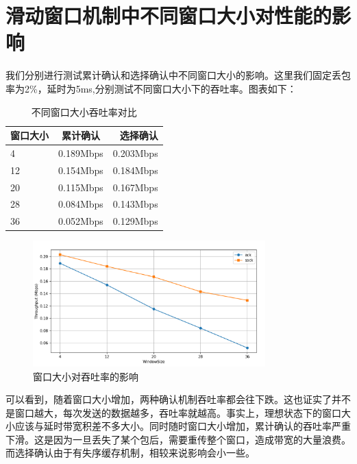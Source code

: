 \documentclass[UTF8,a4paper,10pt]{ctexart}
\begin{document}
\section{滑动窗口机制中不同窗口大小对性能的影响}
我们分别进行测试累计确认和选择确认中不同窗口大小的影响。这里我们固定丢包率为2\%，延时为5ms,分别测试不同窗口大小下的吞吐率。图表如下：
\begin{table}[h!]
  \centering
  \begin{tabular}{|l|c|r|} %
    \hline
     窗口大小   & 累计确认    & 选择确认 \\ \hline
    4  & 0.189Mbps&  0.203Mbps \\ \hline
    12 & 0.154Mbps & 0.184Mbps \\ \hline
    20 & 0.115Mbps & 0.167Mbps \\ \hline
    28 & 0.084Mbps & 0.143Mbps \\ \hline
    36 & 0.052Mbps & 0.129Mbps \\ \hline
  \end{tabular}
  \caption{不同窗口大小吞吐率对比}
  \label{tab:my_label}
\end{table}\par

\begin{figure}[H]
    \centering
\includegraphics[width=0.8\textwidth]{img/p2.png}
    \caption{窗口大小对吞吐率的影响}
\end{figure}

可以看到，随着窗口大小增加，两种确认机制吞吐率都会往下跌。这也证实了并不是窗口越大，每次发送的数据越多，吞吐率就越高。事实上，理想状态下的窗口大小应该与延时带宽积差不多大小。同时随时窗口大小增加，累计确认的吞吐率严重下滑。这是因为一旦丢失了某个包后，需要重传整个窗口，造成带宽的大量浪费。而选择确认由于有失序缓存机制，相较来说影响会小一些。
\end{document}
